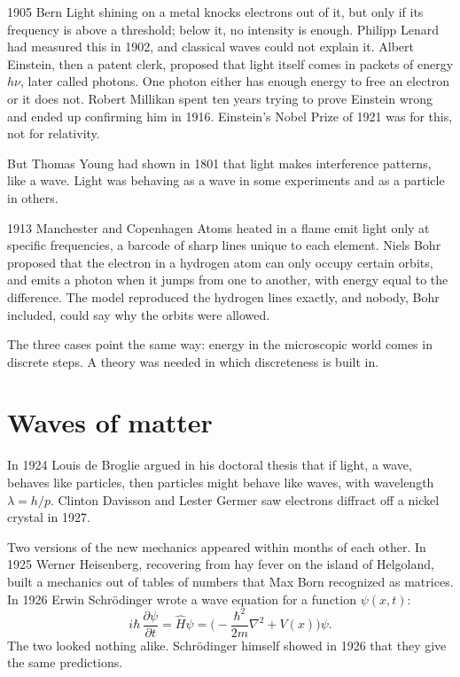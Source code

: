 \begin{history}{1905 \textperiodcentered{} Bern}
Light shining on a metal knocks electrons out of it, but only if its frequency is
above a threshold; below it, no intensity is enough. Philipp Lenard had measured
this in 1902, and classical waves could not explain it. Albert Einstein, then a
patent clerk, proposed that light itself comes in packets of energy $h\nu$, later
called photons. One photon either has enough energy to free an electron or it
does not. Robert Millikan spent ten years trying to prove Einstein wrong and ended
up confirming him in 1916. Einstein's Nobel Prize of 1921 was for this, not for
relativity.
\end{history}

But Thomas Young had shown in 1801 that light makes interference patterns, like a
wave. Light was behaving as a wave in some experiments and as a particle in others.

\begin{history}{1913 \textperiodcentered{} Manchester and Copenhagen}
Atoms heated in a flame emit light only at specific frequencies, a barcode of
sharp lines unique to each element. Niels Bohr proposed that the electron in a
hydrogen atom can only occupy certain orbits, and emits a photon when it jumps
from one to another, with energy equal to the difference. The model reproduced
the hydrogen lines exactly, and nobody, Bohr included, could say why the orbits
were allowed.
\end{history}

The three cases point the same way: energy in the microscopic world comes in
discrete steps. A theory was needed in which discreteness is built in.

\section{Waves of matter}

In 1924 Louis de Broglie argued in his doctoral thesis that if light, a wave,
behaves like particles, then particles might behave like waves, with wavelength
$\lambda = h/p$. Clinton Davisson and Lester Germer saw electrons diffract off a
nickel crystal in 1927.

Two versions of the new mechanics appeared within months of each other. In 1925
Werner Heisenberg, recovering from hay fever on the island of Helgoland, built a
mechanics out of tables of numbers that Max Born recognized as matrices. In 1926
Erwin Schrödinger wrote a wave equation for a function $\psi(x, t)$:
\[
  i\hbar\,\frac{\partial \psi}{\partial t} = \hat H\psi
  = \Big(-\frac{\hbar^2}{2m}\nabla^2 + V(x)\Big)\psi .
\]
The two looked nothing alike. Schrödinger himself showed in 1926 that they give
the same predictions.

